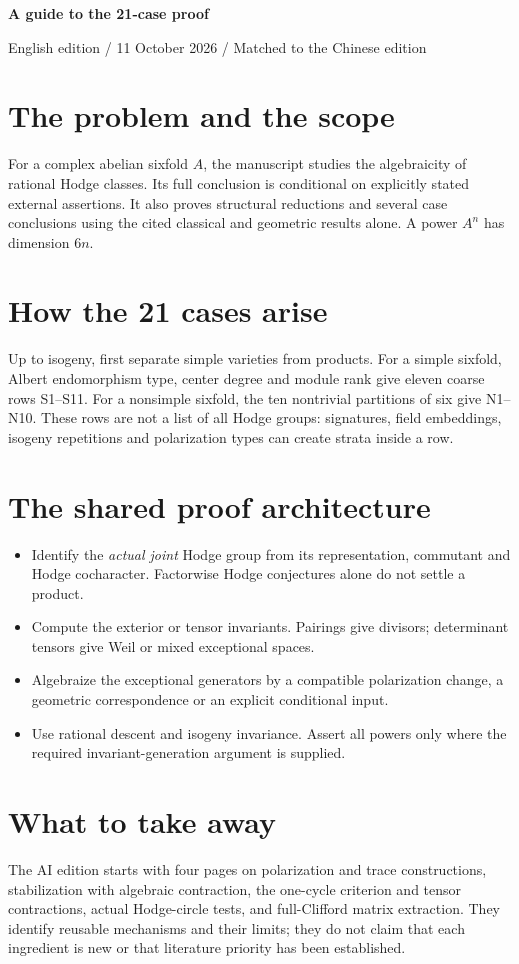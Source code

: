 \documentclass[10pt,a4paper]{article}
\begin{document}
{\LARGE\sffamily\bfseries\color{Ink}A guide to the 21-case proof}\par
{\small English edition / 11 October 2026 / Matched to the Chinese edition}
\section*{The problem and the scope}
For a complex abelian sixfold $A$, the manuscript studies the algebraicity of rational Hodge classes. Its full conclusion is conditional on explicitly stated external assertions. It also proves structural reductions and several case conclusions using the cited classical and geometric results alone. A power $A^n$ has dimension $6n$.
\section*{How the 21 cases arise}
Up to isogeny, first separate simple varieties from products. For a simple sixfold, Albert endomorphism type, center degree and module rank give eleven coarse rows S1--S11. For a nonsimple sixfold, the ten nontrivial partitions of six give N1--N10. These rows are not a list of all Hodge groups: signatures, field embeddings, isogeny repetitions and polarization types can create strata inside a row.
\section*{The shared proof architecture}
\begin{itemize}
\item Identify the \emph{actual joint} Hodge group from its representation, commutant and Hodge cocharacter. Factorwise Hodge conjectures alone do not settle a product.
\item Compute the exterior or tensor invariants. Pairings give divisors; determinant tensors give Weil or mixed exceptional spaces.
\item Algebraize the exceptional generators by a compatible polarization change, a geometric correspondence or an explicit conditional input.
\item Use rational descent and isogeny invariance. Assert all powers only where the required invariant-generation argument is supplied.
\end{itemize}
\section*{What to take away}
The AI edition starts with four pages on polarization and trace constructions, stabilization with algebraic contraction, the one-cycle criterion and tensor contractions, actual Hodge-circle tests, and full-Clifford matrix extraction. They identify reusable mechanisms and their limits; they do not claim that each ingredient is new or that literature priority has been established.
\end{document}
